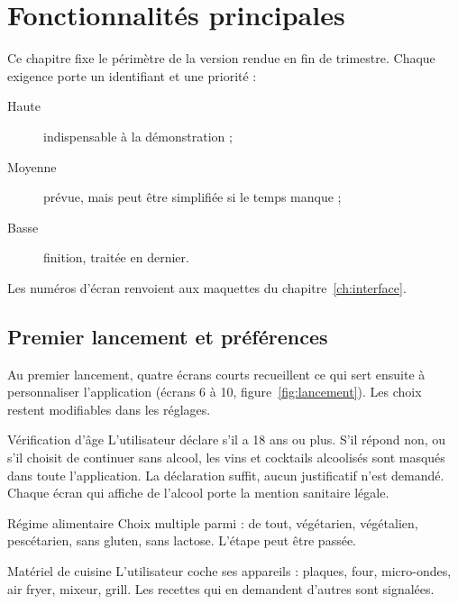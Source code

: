 \chapter{Fonctionnalités principales}

Ce chapitre fixe le périmètre de la version rendue en fin de trimestre. Chaque
exigence porte un identifiant et une priorité :

\begin{description}
  \item[Haute] indispensable à la démonstration ;
  \item[Moyenne] prévue, mais peut être simplifiée si le temps manque ;
  \item[Basse] finition, traitée en dernier.
\end{description}

Les numéros d'écran renvoient aux maquettes du chapitre~\ref{ch:interface}.

\section{Premier lancement et préférences}

Au premier lancement, quatre écrans courts recueillent ce qui sert ensuite à
personnaliser l'application (écrans 6 à 10, figure~\ref{fig:lancement}).
Les choix restent modifiables dans les réglages.

\begin{exigence}[priorite=haute]{Vérification d'âge}
  L'utilisateur déclare s'il a 18 ans ou plus. S'il répond non, ou s'il choisit
  de continuer sans alcool, les vins et cocktails alcoolisés sont masqués dans
  toute l'application. La déclaration suffit, aucun justificatif n'est demandé.
  Chaque écran qui affiche de l'alcool porte la mention sanitaire légale.
\end{exigence}

\begin{exigence}[priorite=haute]{Régime alimentaire}
  Choix multiple parmi : de tout, végétarien, végétalien, pescétarien, sans
  gluten, sans lactose. L'étape peut être passée.
\end{exigence}

\begin{exigence}[priorite=moyenne]{Matériel de cuisine}
  L'utilisateur coche ses appareils : plaques, four, micro-ondes, air fryer,
  mixeur, grill. Les recettes qui en demandent d'autres sont signalées.
\end{exigence}

